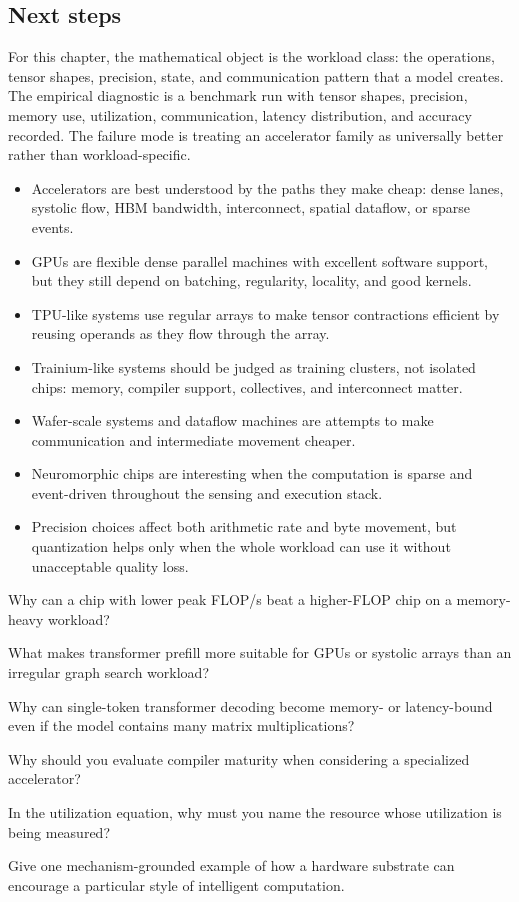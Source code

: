 \subsection{Next steps}

For this chapter, the mathematical object is the workload class: the operations, tensor shapes, precision, state, and communication pattern that a model creates. The empirical diagnostic is a benchmark run with tensor shapes, precision, memory use, utilization, communication, latency distribution, and accuracy recorded. The failure mode is treating an accelerator family as universally better rather than workload-specific.

\begin{chaptersummary}
\begin{itemize}[leftmargin=*]
  \item Accelerators are best understood by the paths they make cheap: dense lanes, systolic flow, HBM bandwidth, interconnect, spatial dataflow, or sparse events.
  \item GPUs are flexible dense parallel machines with excellent software support, but they still depend on batching, regularity, locality, and good kernels.
  \item TPU-like systems use regular arrays to make tensor contractions efficient by reusing operands as they flow through the array.
  \item Trainium-like systems should be judged as training clusters, not isolated chips: memory, compiler support, collectives, and interconnect matter.
  \item Wafer-scale systems and dataflow machines are attempts to make communication and intermediate movement cheaper.
  \item Neuromorphic chips are interesting when the computation is sparse and event-driven throughout the sensing and execution stack.
  \item Precision choices affect both arithmetic rate and byte movement, but quantization helps only when the whole workload can use it without unacceptable quality loss.
\end{itemize}
\end{chaptersummary}

\begin{conceptquestions}
\item Why can a chip with lower peak FLOP/s beat a higher-FLOP chip on a memory-heavy workload?
\item What makes transformer prefill more suitable for GPUs or systolic arrays than an irregular graph search workload?
\item Why can single-token transformer decoding become memory- or latency-bound even if the model contains many matrix multiplications?
\item Why should you evaluate compiler maturity when considering a specialized accelerator?
\item In the utilization equation, why must you name the resource whose utilization is being measured?
\item Give one mechanism-grounded example of how a hardware substrate can encourage a particular style of intelligent computation.
\end{conceptquestions}

